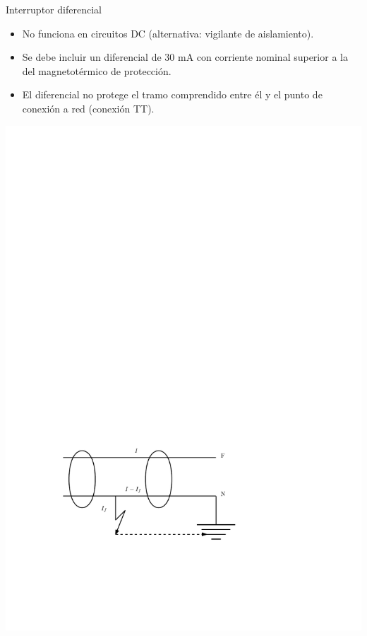 \documentclass[xcolor={usenames,svgnames,dvipsnames}]{beamer}
\begin{document}
\begin{frame}[label={sec:org472d9cc}]{Interruptor diferencial}
\begin{itemize}
\item \alert{No funciona en circuitos DC} (alternativa: vigilante de
aislamiento).

\item Se debe incluir un diferencial de 30 mA con corriente nominal
superior a la del magnetotérmico de protección.

\item El diferencial \alert{no protege el tramo comprendido entre él y el punto
de conexión a red} (conexión TT).
\end{itemize}
\begin{center}
\includegraphics[height=0.3\textheight]{../figs/InterruptorDiferencial.pdf}
\end{center}
\end{frame}
\end{document}
